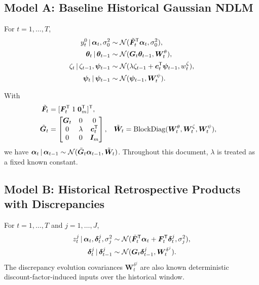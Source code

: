 \subsection{Model A: Baseline Historical Gaussian NDLM}
For $t=1,\dots,T$,
\begin{align}
 y_t^0 \,|\, \bm\alpha_t,\sigma_0^2
 &\sim \mathcal{N}(\tilde{\bm F}_t^{\mathsf{T}} \bm\alpha_t,\sigma_0^2), \label{eq:A_obs}\\
 \bm\theta_t \,|\, \bm\theta_{t-1}
 &\sim \mathcal{N}(\bm G_t\bm\theta_{t-1},\bm W_t^\theta), \label{eq:A_theta}\\
 \zeta_t \,|\, \zeta_{t-1},\bm\psi_{t-1}
 &\sim \mathcal{N}(\lambda\zeta_{t-1}+\bm c_t^{\mathsf{T}}\bm\psi_{t-1},w_t^\zeta), \label{eq:A_zeta}\\
 \bm\psi_t \,|\, \bm\psi_{t-1}
 &\sim \mathcal{N}(\bm\psi_{t-1},\bm W_t^\psi). \label{eq:A_psi}
\end{align}

With
\begin{align}
\tilde{\bm F}_t &= [\bm F_t^{\mathsf{T}}\;1\;\bm 0_m^{\mathsf{T}}]^{\mathsf{T}}, \\
\tilde{\bm G}_t &=
\begin{bmatrix}
\bm G_t & 0 & 0 \\
0 & \lambda & \bm c_t^{\mathsf{T}} \\
0 & 0 & \bm I_m
\end{bmatrix},
&
\tilde{\bm W}_t &= \mathrm{BlockDiag}(\bm W_t^\theta,\bm W_t^\zeta,\bm W_t^\psi),
\end{align}
we have $\bm\alpha_t\,|\,\bm\alpha_{t-1}\sim\mathcal{N}(\tilde{\bm G}_t\bm\alpha_{t-1},\tilde{\bm W}_t)$.
Throughout this document, $\lambda$ is treated as a fixed known constant.

\subsection{Model B: Historical Retrospective Products with Discrepancies}
For $t=1,\dots,T$ and $j=1,\dots,J$,
\begin{align}
z_t^j \,|\, \bm\alpha_t,\bm\delta_t^j,\sigma_j^2
&\sim \mathcal{N}(\tilde{\bm F}_t^{\mathsf{T}}\bm\alpha_t+\bm F_t^{\mathsf{T}}\bm\delta_t^j,\sigma_j^2), \label{eq:B_obs}\\
\bm\delta_t^j\,|\,\bm\delta_{t-1}^j
&\sim \mathcal{N}(\bm G_t\bm\delta_{t-1}^j,\bm W_t^{\delta^j}). \label{eq:B_delta}
\end{align}
The discrepancy evolution covariances $\bm W_t^{\delta^j}$ are also known deterministic
discount-factor-induced inputs over the historical window.

